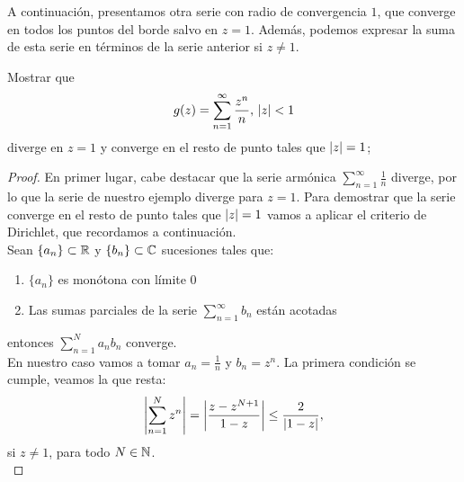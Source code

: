 A continuación, presentamos otra serie con radio de convergencia $1$, que converge en todos los puntos del borde salvo en $z = 1$. Además, podemos expresar la suma de esta serie en términos de la serie anterior si $z \not = 1$. \\

\begin{example}
    Mostrar que
    \begin{equation*}
        g(z) = \sum_{n=1}^{\infty} \frac{z^n}{n}, \, \left\lvert z\right\rvert < 1
    \end{equation*}
    diverge en $z = 1$  y converge en el resto de punto tales que $\left\lvert z\right\rvert = 1$;

\end{example}

\begin{proof}
    En primer lugar, cabe destacar que la serie armónica $\sum_{n=1}^{\infty} \frac{1}{n}$ diverge, por lo que la serie de nuestro ejemplo diverge para $z = 1$. Para demostrar que la serie converge en el resto de punto tales que $\left\lvert z\right\rvert = 1$ vamos a aplicar el criterio de Dirichlet, que recordamos a continuación. \\

    Sean $\{a_n\} \subset \mathbb{R}$ y $\{b_n\} \subset \mathbb{C}$ sucesiones tales que:
    \begin{enumerate}
        \item $\{a_n\}$ es monótona con límite $0$
        \item Las sumas parciales de la serie $\sum_{n=1}^{\infty} b_n$ están acotadas
    \end{enumerate}
    entonces $\sum_{n=1}^{N} a_nb_n$ converge. \\

    En nuestro caso vamos a tomar $a_n = \frac{1}{n}$ y $b_n = z^n$. La primera condición se cumple, veamos la que resta:
    \begin{equation*}
        \left\lvert\sum_{n=1}^{N} z^n\right\rvert = \left\lvert\frac{z - z^{N+1}}{1 - z}\right\rvert \leq \frac{2}{\left\lvert1 - z\right\rvert},
    \end{equation*}
    si $z \neq 1$, para todo $N \in \mathbb{N}$. \\


\end{proof}
